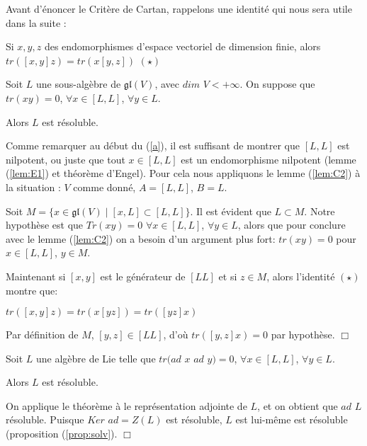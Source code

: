 \documentclass[a4paper,openany,12pt]{report}
\newcommand{\gl}{\mathfrak{gl}}
\theoremstyle{break}
{\theorembodyfont{\upshape}
\newtheorem*{rmq}{Remarque :}
\newtheorem*{prv}{Preuve :}
\newtheorem*{ex}{Exemples :}
\newtheorem*{exe}{Exemple : }
\newtheorem*{nota}{Notation :}
\newtheorem*{dem}{D\'emonstration :}}
\begin{document}
Avant d'énoncer le Critère de Cartan, rappelons une identité qui nous sera utile dans la suite : 
\begin{center}
Si $x,y,z$ des endomorphismes d'espace vectoriel de dimension finie, alors $tr([x,y]z)=tr(x[y,z])$ $(\star)$
\end{center}

\begin{thm}\label{cartan}
Soit $L$ une sous-algèbre de $\gl(V)$, avec $dim$ $V<+\infty$. On suppose que $tr(xy)=0$, $\forall x \in [L,L]$, $\forall y \in L$.

Alors $L$ est résoluble. 
\end{thm}

\begin{dem}
\quad Comme remarquer au début du (\ref{a}), il est suffisant de montrer que $[L,L]$ est nilpotent, ou juste que tout $x \in [L,L]$ est un endomorphisme nilpotent (lemme (\ref{lem:E1}) et théorème d'Engel). Pour cela nous appliquons le lemme (\ref{lem:C2}) à la situation : $V$ comme donné, $A=[L,L]$, $B=L$.

Soit $M= \{ x \in \gl(V) \mid [x,L] \subset [L,L] \}$. Il est évident que $L \subset M$. Notre hypothèse est que $Tr(xy)=0$ $\forall x \in [L,L]$, $\forall y \in L$, alors que pour conclure avec le lemme (\ref{lem:C2}) on a besoin d'un argument plus fort: \quad $tr(xy)=0$ pour $x \in [L,L]$, $y \in M$.

Maintenant si $[x,y]$ est le générateur de $[LL]$ et si $z \in M$, alors l'identité $(\star)$ montre que:
\begin{center}
$tr([x,y]z)=tr(x[yz])=tr([yz]x)$
\end{center}

Par définition de $M$, $[y,z] \in [LL]$, d'où $tr([y,z]x)=0$ par hypothèse. $\Box$
\end{dem}

\begin{cor}
\quad Soit $L$ une algèbre de Lie telle que $tr(ad$ $x$ $ad$ $y) = 0$, $\forall x \in [L,L]$, $\forall y \in  L$.

Alors $L$ est résoluble.
\end{cor}

\begin{prv}
\quad On applique le théorème à le représentation adjointe de $L$, et on obtient que $ad$ $L$ résoluble. Puisque $Ker$ $ad = Z(L)$ est résoluble, $L$ est lui-même est résoluble (proposition (\ref{prop:solv}). $\Box$
\end{prv}
\end{document}
